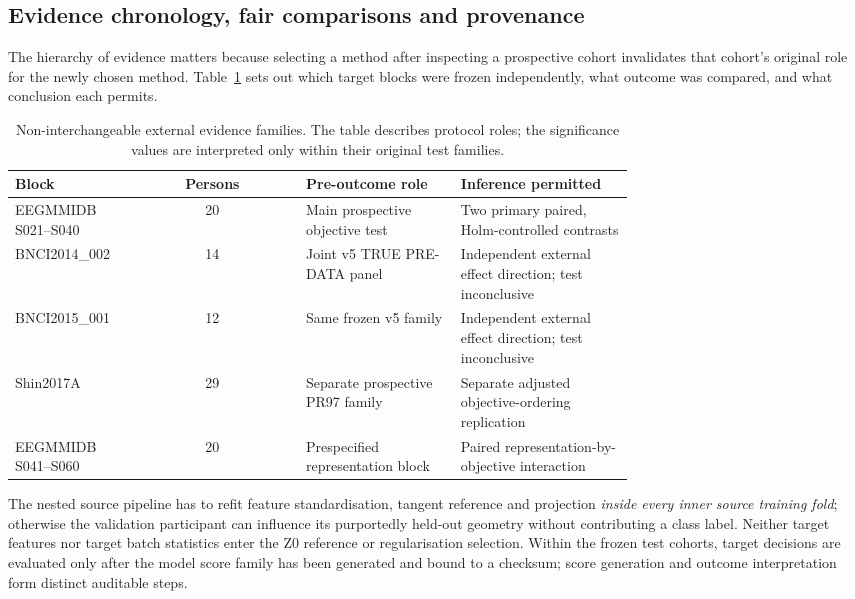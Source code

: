 
\subsection{Evidence chronology, fair comparisons and provenance}
The hierarchy of evidence matters because selecting a method
after inspecting a prospective cohort invalidates that cohort's
original role for the newly chosen method. Table~\ref{tab:evidence-role-v13}
sets out which target blocks were frozen independently, what outcome
was compared, and what conclusion each permits.

\begin{table}[tb]
\centering
\caption{Non-interchangeable external evidence families. The table
describes protocol roles; the significance values are interpreted
only within their original test families.}
\label{tab:evidence-role-v13}
\small
\begin{tabular}{p{0.19\linewidth}c p{0.25\linewidth} p{0.28\linewidth}}
\toprule
Block & Persons & Pre-outcome role & Inference permitted\\
\midrule
EEGMMIDB S021--S040 & 20 & Main prospective objective test &
Two primary paired, Holm-controlled contrasts\\
BNCI2014\_002 & 14 & Joint v5 TRUE PRE-DATA panel &
Independent external effect direction; test inconclusive\\
BNCI2015\_001 & 12 & Same frozen v5 family &
Independent external effect direction; test inconclusive\\
Shin2017A & 29 & Separate prospective PR97 family &
Separate adjusted objective-ordering replication\\
EEGMMIDB S041--S060 & 20 & Prespecified representation block &
Paired representation-by-objective interaction\\
\bottomrule
\end{tabular}
\end{table}

The nested source pipeline has to refit feature standardisation,
tangent reference and projection \emph{inside every inner source
training fold}; otherwise the validation participant can influence
its purportedly held-out geometry without contributing a class label.
Neither target features nor target batch statistics enter the Z0
reference or regularisation selection. Within the frozen test
cohorts, target decisions are evaluated only after the model score
family has been generated and bound to a checksum; score generation
and outcome interpretation form distinct auditable steps.

